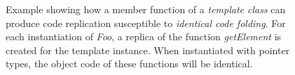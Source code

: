 \begin{figure}[h]
\caption{Example showing how a member function of a \textit{template class}
  can produce code replication susceptible to \textit{identical code folding}.
  For each instantiation of \textit{Foo}, a replica of the function
  \textit{getElement} is created for the template instance.
  When instantiated with pointer types, the object code of these functions will be identical.}
\label{fig:icf-example}
\end{figure}
